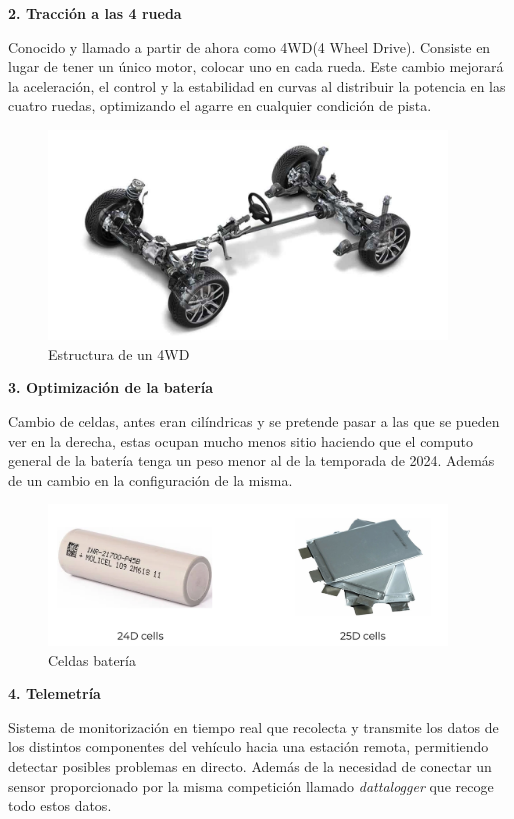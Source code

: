 \documentclass[
]{article}
\begin{document}
\textbf{2. Tracción a las 4 rueda}

Conocido y llamado a partir de ahora como 4WD(4 Wheel Drive). Consiste
en lugar de tener un único motor, colocar uno en cada rueda. Este cambio
mejorará la aceleración, el control y la estabilidad en curvas al
distribuir la potencia en las cuatro ruedas, optimizando el agarre en
cualquier condición de pista.

\begin{figure}
\centering
\includegraphics[width=4.16667in,height=\textheight]{Fotos/4WD.png}
\caption{Estructura de un 4WD}
\end{figure}

\textbf{3. Optimización de la batería}

Cambio de celdas, antes eran cilíndricas y se pretende pasar a las que
se pueden ver en la derecha, estas ocupan mucho menos sitio haciendo que
el computo general de la batería tenga un peso menor al de la temporada
de 2024. Además de un cambio en la configuración de la misma.

\begin{figure}
\centering
\includegraphics[width=4.16667in,height=\textheight]{Fotos/bateria.png}
\caption{Celdas batería}
\end{figure}

\textbf{4. Telemetría}

Sistema de monitorización en tiempo real que recolecta y transmite los
datos de los distintos componentes del vehículo hacia una estación
remota, permitiendo detectar posibles problemas en directo. Además de la
necesidad de conectar un sensor proporcionado por la misma competición
llamado \emph{dattalogger} que recoge todo estos datos.
\end{document}
